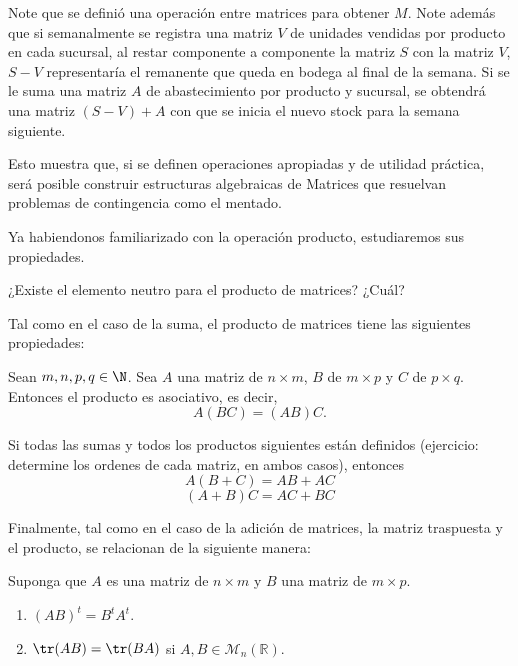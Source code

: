 \begin{ejem}
Note que se definió una operación entre matrices para obtener $M$. Note además que
si semanalmente se registra una matriz $V$ de unidades vendidas por producto en cada
sucursal, al restar componente a componente la matriz $S$ con la matriz $V$, $S-V$ representaría
el remanente que queda en bodega al final de la semana. Si se le suma una matriz $A$ de
abastecimiento por producto y sucursal, se obtendrá una matriz $(S-V) + A$ con que se inicia
el nuevo stock para la semana siguiente.

Esto muestra que, si se definen operaciones apropiadas y de utilidad práctica, será
posible construir estructuras algebraicas de Matrices que resuelvan problemas de
contingencia como el mentado.
\end{ejem}

Ya habiendonos familiarizado con la operaci\'on producto, estudiaremos sus propiedades.

\begin{ejer}
    ¿Existe el elemento neutro para el producto de matrices? ¿Cu\'al?
\end{ejer}

Tal como en el caso de la suma, el producto de matrices tiene las siguientes propiedades:
\begin{thm}[Asociatividad]
Sean $m,n,p,q \in \N$. Sea $A$ una matriz de $n \times m$, $B$ de $m \times p$ y $C$ de $p \times q$. Entonces el producto es asociativo, es decir,
$$A(BC) = (AB)C.$$
\end{thm}
\begin{thm}[Distributividad]

Si todas las sumas y todos los productos siguientes están definidos (ejercicio: determine los ordenes de cada matriz, en ambos casos), entonces 
$$A(B+C) = AB+AC$$  $$(A+B)C = AC + BC$$
\end{thm}




Finalmente, tal como en el caso de la adici\'on de matrices, la matriz traspuesta y el producto, se relacionan de la siguiente manera:
\begin{thm}
Suponga que $A$ es una matriz de $n \times m$ y $B$ una matriz de $m \times p$.

\begin{enumerate}
\item
$(AB)^t = B^t A^t$.
\item $\tr(AB)=
\tr(BA)$ si $A, B\in \mathcal{M}_n(\mathbb{R})$.
\end{enumerate}
\end{thm}

